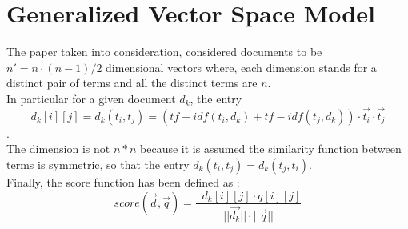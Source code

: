 \documentclass[letterpaper, 10 pt, conference]{ieeeconf}  %
\begin{document}
\section{Generalized Vector Space Model}
The paper\cite{c1} taken into consideration, considered documents to be $n' = n\cdot(n-1)/2$ dimensional vectors where, each dimension stands for a distinct pair of terms and all the distinct terms are $n$.\\In particular for a given document $d_k$, the entry
\begin{equation}
    d_k[i][j] = d_k(t_i,t_j) = (tf-idf(t_i,d_k)+tf-idf(t_j,d_k)) \cdot \vec{t_i}\cdot\vec{t_j}
\end{equation}.\\The dimension is not $n*n$ because it is assumed the similarity function between terms is symmetric, so that the entry  $d_k(t_i,t_j) = d_k(t_j,t_i)$.\\Finally, the score function has been defined as :
\begin{equation}
    score(\vec{d},\vec{q}) = \frac{\mathop{\sum_{j=1}^{n'}\sum_{i=1}^{n'}}d_k[i][j]\cdot q[i][j] }{||\vec{d_k} ||\cdot||\vec{q} ||}
\end{equation}
\end{document}
